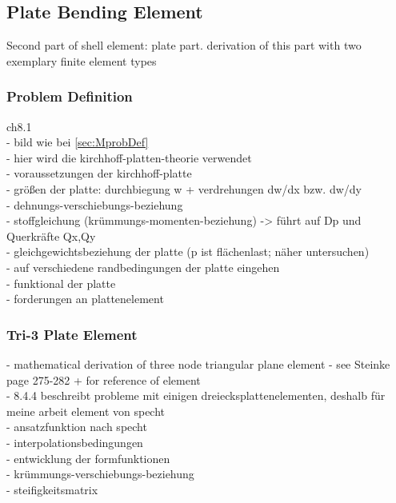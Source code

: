  \subsection{Plate Bending Element}
 Second part of shell element: plate part. derivation of this part with two exemplary finite element types
  \subsubsection{Problem Definition}
  \cite{steinke2005finite} ch8.1\\
  - bild wie bei \ref{sec:MprobDef}\\
  - hier wird die kirchhoff-platten-theorie verwendet\\
  - voraussetzungen der kirchhoff-platte\\
  - größen der platte: durchbiegung w + verdrehungen dw/dx bzw. dw/dy\\
  - dehnungs-verschiebungs-beziehung\\
  - stoffgleichung (krümmungs-momenten-beziehung) -> führt auf Dp und Querkräfte Qx,Qy\\
  - gleichgewichtsbeziehung der platte (p ist flächenlast; näher untersuchen)\\
  - auf verschiedene randbedingungen der platte eingehen\\
  - funktional der platte\\
  - forderungen an plattenelement
  \subsubsection{Tri-3 Plate Element} \cite{steinke2005finite}\cite{specht1988modified}
  - mathematical derivation of three node triangular plane element\newline
  - see Steinke \cite{steinke2005finite} page 275-282 + \cite{specht1988modified} for reference of element\\
  - 8.4.4 beschreibt probleme mit einigen dreiecksplattenelementen, deshalb für meine arbeit element von specht \cite{specht1988modified}\\
  - ansatzfunktion nach specht\\
  - interpolationsbedingungen\\
  - entwicklung der formfunktionen\\
  - krümmungs-verschiebungs-beziehung\\
  - steifigkeitsmatrix
